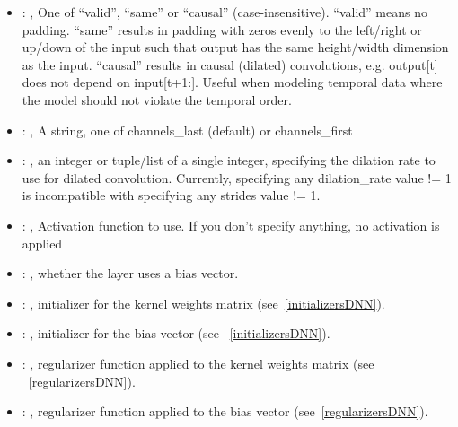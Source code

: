 \begin{itemize}
\begin{itemize}
        \item {}: , 
          One of ``valid'', ``same'' or ``causal'' (case-insensitive). ``valid'' means no padding.
          ``same'' results in padding with zeros evenly to the left/right or up/down of the input
          such that         output has the same height/width dimension as the input. ``causal''
          results in causal (dilated) convolutions,         e.g. output[t] does not depend on
          input[t+1:]. Useful when modeling temporal data where the model should         not violate
          the temporal order.

        \item {}: , 
          A string, one of channels\_last (default) or channels\_first

        \item {}: , 
          an integer or tuple/list of a single integer, specifying the dilation rate to use for
          dilated         convolution. Currently, specifying any dilation\_rate value != 1 is
          incompatible with specifying any         strides value != 1.

        \item {}: , 
          Activation function to use. If you don't specify anything, no activation is applied

        \item {}: , 
          whether the layer uses a bias vector.

        \item {}: , 
          initializer for the kernel weights matrix (see~\ref{initializersDNN}).

        \item {}: , 
          initializer for the bias vector (see ~\ref{initializersDNN}).

        \item {}: , 
          regularizer function applied to the kernel weights matrix (see ~\ref{regularizersDNN}).

        \item {}: , 
          regularizer function applied to the bias vector (see~\ref{regularizersDNN}).


\end{itemize}
\end{itemize}
